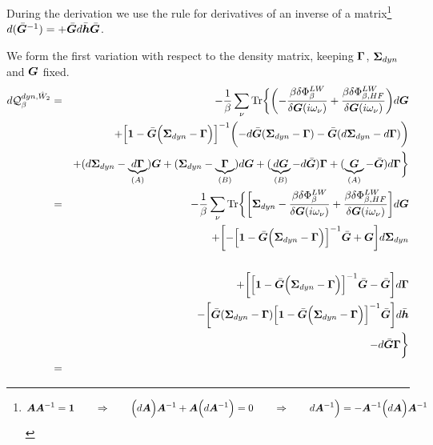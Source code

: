\documentclass[11pt,a4paper]{report}
\begin{document}
During the derivation we use the rule for derivatives of an inverse of
a matrix\footnote{\begin{eqnarray} 
\bm{A}\bm{A}^{-1}=\bm{1}
\qquad\Rightarrow\qquad
\Bigl(d\bm{A}\Bigr)\bm{A}^{-1}
+\bm{A}\Bigl(d\bm{A}^{-1}\Bigr)=0
\qquad\Rightarrow\qquad
d\bm{A}^{-1}\Bigr)=-\bm{A}^{-1}\Bigl(d\bm{A}\Bigr)\bm{A}^{-1}
\end{eqnarray}
}
$d(\bar{\bm{G}}^{-1})=+\bar{\bm{G}}d\bar{\bm{h}}\bar{\bm{G}}$.

We form the first variation with respect to the density matrix,
keeping $\bm{\Gamma}$, $\bm{\Sigma}_{dyn}$ and $\bm{G}$ fixed.
\begin{eqnarray}
d\mathcal{Q}_{\beta}^{dyn,\hat{W}_2}
&=&
-\frac{1}{\beta}\sum_\nu\Tr\biggl\lbrace
\biggl(-\frac{\beta\delta\Phi^{LW}_\beta}{\delta\mat{G}(i\omega_\nu)}
+\frac{\beta\delta\Phi^{LW}_{\beta,HF}}{\delta\mat{G}(i\omega_\nu)}\biggr)d\mat{G}
\nonumber\\
&&+\Bigl[\mat{1}-\bar{\mat{G}}
\Bigl(\mat{\Sigma}_{dyn}-\mat{\Gamma}\Bigr)\Bigr]^{-1}
\biggl(-d\bar{\mat{G}}(\mat{\Sigma}_{dyn}-\mat{\Gamma})
-\bar{\mat{G}}(d\mat{\Sigma}_{dyn}-d\mat{\Gamma})\biggr)
\nonumber\\
&&+(d\mat{\Sigma}_{dyn}-\underbrace{d\mat{\Gamma}}_{(A)})\mat{G}
+(\mat{\Sigma}_{dyn}-\underbrace{\mat{\Gamma}}_{(B)})d\mat{G}
+(\underbrace{d\mat{G}}_{(B)}-d\bar{\mat{G}})\mat{\Gamma}
+(\underbrace{\mat{G}}_{(A)}-\bar{\mat{G}})d\mat{\Gamma}
\biggr\rbrace
\nonumber\\
&=&
-\frac{1}{\beta}\sum_\nu\Tr\biggl\lbrace
\biggr[\mat{\Sigma}_{dyn}
-\frac{\beta\delta\Phi^{LW}_\beta}{\delta\mat{G}(i\omega_\nu)}
+\frac{\beta\delta\Phi^{LW}_{\beta,HF}}{\delta\mat{G}(i\omega_\nu)}
\biggr]d\mat{G}
\nonumber\\
&&+\biggl[
-\Bigl[\mat{1}-\bar{\mat{G}}
\Bigl(\mat{\Sigma}_{dyn}-\mat{\Gamma}\Bigr)\Bigr]^{-1}
\bar{\mat{G}}+\mat{G}\biggr]d\mat{\Sigma}_{dyn}
\nonumber\\
&&
\nonumber\\
&&+\biggl[\Bigl[\mat{1}-\bar{\mat{G}}
\Bigl(\mat{\Sigma}_{dyn}-\mat{\Gamma}\Bigr)\Bigr]^{-1}
\bar{\mat{G}}
-\bar{\mat{G}}
\biggr]d\mat{\Gamma}
\nonumber\\
&&
-\biggl[\bar{\mat{G}}(\mat{\Sigma}_{dyn}-\mat{\Gamma})
\Bigl[\mat{1}-\bar{\mat{G}}
\Bigl(\mat{\Sigma}_{dyn}-\mat{\Gamma}\Bigr)\Bigr]^{-1}
\bar{\mat{G}}\biggr]d\bar{\mat{h}}
\nonumber\\
&&
-d\bar{\mat{G}}\mat{\Gamma}
\biggr\rbrace
\nonumber\\
&=&

\end{eqnarray}
\end{document}
